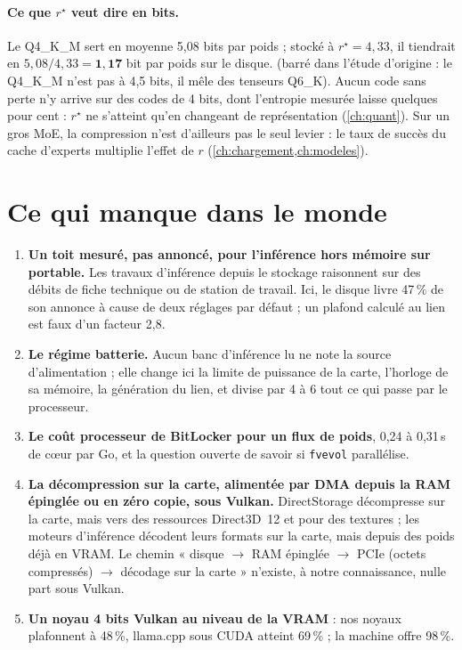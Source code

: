\paragraph{Ce que $r^\star$ veut dire en bits.} Le Q4\_K\_M sert en moyenne 5,08 bits par poids ; stocké à $r^\star = 4{,}33$, il tiendrait en $5{,}08/4{,}33 = \mathbf{1{,}17}$ bit par poids sur le disque.  (barré dans l'étude d'origine : le Q4\_K\_M n'est pas à 4,5 bits, il mêle des tenseurs Q6\_K). Aucun code sans perte n'y arrive sur des codes de 4 bits, dont l'entropie mesurée laisse quelques pour cent : $r^\star$ ne s'atteint qu'en changeant de représentation (\cref{ch:quant}). Sur un gros MoE, la compression n'est d'ailleurs pas le seul levier : le taux de succès du cache d'experts multiplie l'effet de $r$ (\cref{ch:chargement,ch:modeles}).

\section{Ce qui manque dans le monde}

\begin{enumerate}
\item \textbf{Un toit mesuré, pas annoncé, pour l'inférence hors mémoire sur portable.} Les travaux d'inférence depuis le stockage raisonnent sur des débits de fiche technique ou de station de travail. Ici, le disque livre 47\,\% de son annonce à cause de deux réglages par défaut ; un plafond calculé au lien est faux d'un facteur 2,8.
\item \textbf{Le régime batterie.} Aucun banc d'inférence lu ne note la source d'alimentation ; elle change ici la limite de puissance de la carte, l'horloge de sa mémoire, la génération du lien, et divise par 4 à 6 tout ce qui passe par le processeur.
\item \textbf{Le coût processeur de BitLocker pour un flux de poids}, 0,24 à 0,31\,s de cœur par Go, et la question ouverte de savoir si \texttt{fvevol} parallélise.
\item \textbf{La décompression sur la carte, alimentée par DMA depuis la RAM épinglée ou en zéro copie, sous Vulkan.} DirectStorage décompresse sur la carte, mais vers des ressources Direct3D~12 et pour des textures ; les moteurs d'inférence décodent leurs formats sur la carte, mais depuis des poids déjà en VRAM. Le chemin « disque $\to$ RAM épinglée $\to$ PCIe (octets compressés) $\to$ décodage sur la carte » n'existe, à notre connaissance, nulle part sous Vulkan.
\item \textbf{Un noyau 4 bits Vulkan au niveau de la VRAM} : nos noyaux plafonnent à 48\,\%, llama.cpp sous CUDA atteint 69\,\% ; la machine offre 98\,\%.
\end{enumerate}

